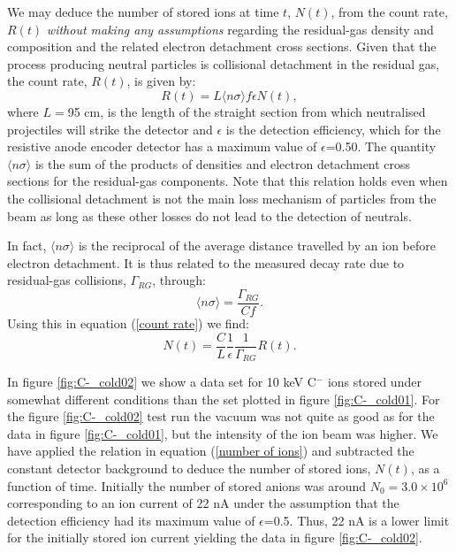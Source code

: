 \documentclass[aps,pra,preprint,superscriptaddress]{revtex4}
\begin{document}

We may deduce the number of stored ions at time $t$, $N(t)$, from the count rate, $R(t)$ {\it without making any assumptions} regarding the residual-gas density and composition and the related electron detachment cross sections. Given that the process producing neutral particles is collisional detachment in the residual gas, the count rate, $R(t)$, is given by:
\begin{equation}\label{count rate}
R(t)=L \langle n\sigma \rangle f\epsilon N(t),
\end{equation}
where $L=$95 cm, is the length of the straight section from which neutralised projectiles will strike the detector and $\epsilon$ is the detection efficiency, which for the resistive anode encoder detector has a maximum value of $\epsilon$=0.50. The quantity $\langle n\sigma \rangle$ is the sum of the products of densities and electron detachment cross sections for the residual-gas components. Note that this relation holds even when the collisional detachment is not the main loss mechanism of particles from the beam as long as these other losses do not lead to the detection of neutrals. 

In fact, $\langle n\sigma \rangle$ is the reciprocal of the average distance travelled by an ion before electron detachment. It is thus related to the measured decay rate due to residual-gas collisions, $\Gamma_{RG}$, through:
\begin{equation}\label{nsigma}
\langle n\sigma \rangle=\frac{\Gamma_{RG}}{Cf}.
\end{equation}
Using this in equation (\ref{count rate}) we find:
\begin{equation}\label{number of ions}
N(t)=\frac{C}{L} \frac{1}{\epsilon} \frac{1}{\Gamma_{RG}} R(t).
\end{equation}

In figure \ref{fig:C-_cold02} we show a data set for 10 keV C$^-$ ions stored under somewhat different conditions than the set plotted in figure \ref{fig:C-_cold01}. For the figure \ref{fig:C-_cold02} test run the vacuum was not quite as good as for the data in figure \ref{fig:C-_cold01}, but the intensity of the ion beam was higher. We have applied the relation in equation (\ref{number of ions}) and subtracted the constant detector background to deduce the number of stored ions, $N(t)$, as a function of time. Initially the number of stored anions was around $N_0 = 3.0 \times 10^6$ corresponding to an ion current of 22 nA  under the assumption that the detection efficiency had its maximum value of $\epsilon$=0.5.
Thus, 22 nA is a lower limit for the initially stored ion current yielding the data in figure \ref{fig:C-_cold02}.
\end{document}

